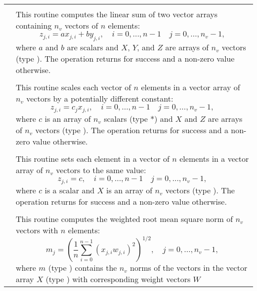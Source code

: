 \begin{xtabular}{|p{\colonec}|p{\coltwoc}|}
 &  \\
& This routine computes the linear sum of two vector arrays containing $n_v$
vectors of $n$ elements:
\begin{equation*}
z_{j,i} = a x_{j,i} + b y_{j,i}, \quad i=0,\ldots,n-1 \quad j=0,\ldots,n_v-1,
\end{equation*}
where $a$ and $b$ are  scalars and $X$, $Y$, and $Z$ are arrays of
$n_v$ vectors (type ). The operation returns  for success and
a non-zero value otherwise.
\\[2mm]
 &  \\
& This routine scales each vector of $n$ elements in a vector array of $n_v$
vectors by a potentially different constant:
\begin{equation*}
z_{j,i} = c_j x_{j,i}, \quad i=0,\ldots,n-1 \quad j=0,\ldots,n_v-1,
\end{equation*}
where $c$ is an array of $n_v$ scalars (type *) and $X$ and $Z$ are
arrays of $n_v$ vectors (type ). The operation returns  for
success and a non-zero value otherwise.
\\[2mm]
 &  \\
& This routine sets each element in a vector of $n$ elements in a vector array of
$n_v$ vectors to the same value:
\begin{equation*}
z_{j,i} = c, \quad i=0,\ldots,n-1 \quad j=0,\ldots,n_v-1,
\end{equation*}
where $c$ is a  scalar and $X$ is an array of $n_v$ vectors (type
). The operation returns  for success and a non-zero value
otherwise.
\\[2mm]
 &  \\
& This routine computes the weighted root mean square norm of $n_v$ vectors with
$n$ elements:
\begin{equation*}
m_j = \left( \frac1n \sum_{i=0}^{n-1} \left(x_{j,i} w_{j,i}\right)^2\right)^{1/2}, \quad j=0,\ldots,n_v-1,
\end{equation*}
where $m$ (type ) contains the $n_v$ norms of the vectors in the
vector array $X$ (type ) with corresponding weight vectors $W$

\end{xtabular}
